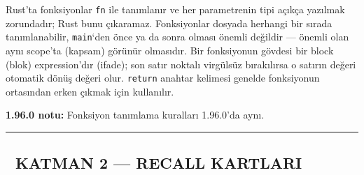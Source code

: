 \documentclass[12pt,a4paper]{article}
\begin{document}
Rust'ta fonksiyonlar \texttt{fn} ile tanımlanır ve her parametrenin tipi açıkça yazılmak zorundadır; Rust bunu çıkaramaz. Fonksiyonlar dosyada herhangi bir sırada tanımlanabilir, \texttt{main}`den önce ya da sonra olması önemli değildir --- önemli olan aynı scope'ta (kapsam) görünür olmasıdır. Bir fonksiyonun gövdesi bir block (blok) expression'dır (ifade); son satır noktalı virgülsüz bırakılırsa o satırın değeri otomatik dönüş değeri olur. \texttt{return} anahtar kelimesi genelde fonksiyonun ortasından erken çıkmak için kullanılır.

\textbf{1.96.0 notu:} Fonksiyon tanımlama kuralları 1.96.0'da aynı.

\begin{center}\rule{0.5\linewidth}{0.5pt}\end{center}

\subsection{🔵 KATMAN 2 --- RECALL KARTLARI}\label{katman-2-—-recall-kartlari-9}
\end{document}
